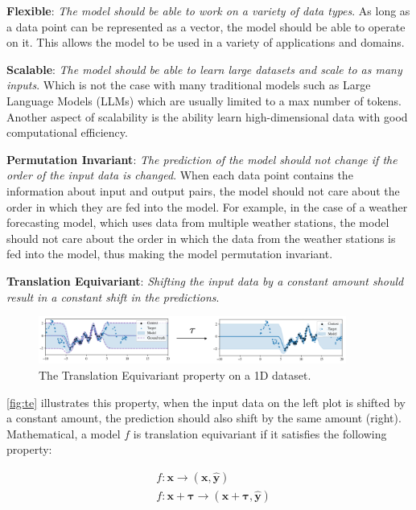 \documentclass[../../main.tex]{subfiles}
\begin{document}
\textbf{Flexible}: \emph{The model should be able to work on a variety of data types}. As long as a data point can be represented as a vector, the model should be able to operate on it. This allows the model to be used in a variety of applications and domains.

\textbf{Scalable}: \emph{The model should be able to learn large datasets and scale to as many inputs}. Which is not the case with many traditional models such as Large Language Models (LLMs) which are usually limited to a max number of tokens. Another aspect of scalability is the ability learn high-dimensional data with good computational efficiency.


\textbf{Permutation Invariant}: \emph{The prediction of the model should not change if the order of the input data is changed}. When each data point contains the information about input and output pairs, the model should not care about the order in which they are fed into the model. For example, in the case of a weather forecasting model, which uses data from multiple weather stations, the model should not care about the order in which the data from the weather stations is fed into the model, thus making the model permutation invariant.

\textbf{Translation Equivariant}: \emph{Shifting the input data by a constant amount should result in a constant shift in the predictions}. 

\begin{figure}[H]
	\centering
	\includegraphics[width=0.9\textwidth]{./te.png}
	\caption{The Translation Equivariant property on a 1D dataset.}
	\label{fig:te}
\end{figure}


\autoref{fig:te} illustrates this property, when the input data on the left plot is shifted by a constant amount, the prediction should also shift by the same amount (right). Mathematical, a model $f$ is translation equivariant if it satisfies the following property:

\begin{align}
	&f: \bm{x} \rightarrow (\bm{x}, \bm{\hat{y}}) \\
	&f: \bm{x} + \bm{\tau} \rightarrow (\bm{x} + \bm{\tau}, \bm{\hat{y}})
\end{align}
\end{document}
